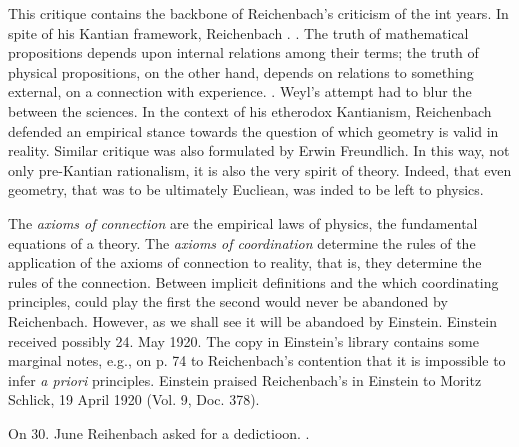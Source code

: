 \documentclass[draft]{article}
\begin{document}
This critique contains the backbone of Reichenbach's criticism of the \uftp int years. In spite of his Kantian framework, Reichenbach . . The truth of mathematical propositions depends upon internal relations among their terms; the truth of physical propositions, on the other hand, depends on relations to something external, on a connection with experience. . Weyl's attempt had to blur the between the sciences. In the context of his etherodox Kantianism, Reichenbach defended an empirical stance towards the question of which geometry is valid in reality. Similar critique was also formulated by Erwin Freundlich. In this way, not only pre-Kantian rationalism, it is also the very spirit of \rt theory. Indeed, that even geometry, that was to be ultimately Eucliean, was inded to be left to physics.


The \emph{axioms of connection} are the empirical laws of physics, the fundamental equations of a theory. The \emph{axioms of coordination} determine the rules of the application of the axioms of connection to reality, that is, they determine the rules of the connection. Between implicit definitions and the which coordinating principles, could play the first the second would never be abandoned by Reichenbach. However, as we shall see it will be abandoed by Einstein. Einstein received possibly 24. May 1920. The copy in Einstein's library contains some marginal notes, e.g.,  on p. 74 to Reichenbach's contention that it is impossible to infer \textit{a priori} principles.  Einstein praised Reichenbach's  in Einstein to Moritz Schlick, 19 April 1920 (Vol. 9, Doc. 378).

On 30. June Reihenbach asked for a dedictioon.   . 
\end{document}
